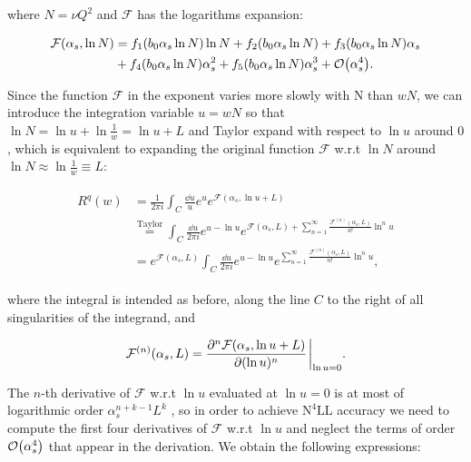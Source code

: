 \documentclass[../Tesi_Jiahao_Miao_986136.tex]{subfiles}
\begin{document}
where $N=\nu Q^2$ and $\mathcal{F}$ has the logarithms expansion:

\begin{align}
    \begin{split}
    \mathcal{F}(\alpha_s,\ln N) &= f_1(b_0 \alpha_s \ln N) \ln N + f_2(b_0 \alpha_s \ln N) + f_3(b_0 \alpha_s \ln N) \alpha_s \\
    &+ f_4(b_0 \alpha_s \ln N) \alpha_s^2 + f_5(b_0 \alpha_s \ln N) \alpha_s^3 + \order{\alpha_s^4}.
\end{split}
\end{align}

Since the function $\mathcal{F}$ in the exponent varies more slowly with N than $wN$, we can introduce the integration variable $u=wN$
so that $\ln N = \ln u +\ln \frac{1}{w} = \ln u + L$ and Taylor expand with respect to $\ln u$ around $0$, which is equivalent to expanding 
the original function $\mathcal{F}$ w.r.t $\ln N$ around $\ln N \approx \ln \frac{1}{w}\equiv L$:

\begin{align}
    \begin{split}\label{eq:Rw expansion}
       R^q(w) &= \frac{1}{2\pi i} \int_C \frac{\dd u}{u} e^{u} e^{\mathcal{F}(\alpha_s,\ln u + L)} \\
       &\stackrel{\text{Taylor}}{=} \int_C \frac{\dd u}{2\pi i} e^{u-\ln u} e^{\mathcal{F}(\alpha_s,L)+\sum_{n=1}^\infty \frac{\mathcal{F}^{(n)}(\alpha_s,L)}{n!}  \ln^n u}\\
       &= e^{\mathcal{F}(\alpha_s,L)} \int_C \frac{\dd u}{2\pi i} e^{u-\ln u} e^{\sum_{n=1}^\infty \frac{\mathcal{F}^{(n)}(\alpha_s,L)}{n!}  \ln^n u},
    \end{split}
\end{align}

where the integral is intended as before, along the line $C$ to the right of all singularities of the integrand, and 

\begin{equation}
    \mathcal{F}^{(n)}(\alpha_s,L) = \pdv[n]{\mathcal{F}(\alpha_s,\ln u + L )}{(\ln u)} \eval_{\ln u = 0}.
\end{equation}

The $n$-th derivative of $\mathcal{F}$ w.r.t $\ln u$ evaluated at $\ln u = 0$ is 
at most of logarithmic order $\alpha_s^{n+k-1}L^k$ \cite{CATANI19933}, so in order to achieve $\text{N}^4\text{LL}$ accuracy we need to compute the first four derivatives of $\mathcal{F}$ w.r.t $\ln u$ and 
neglect the terms of order $\order{\alpha_s^4}$ that appear in the derivation. We obtain the following expressions: 
\end{document}
